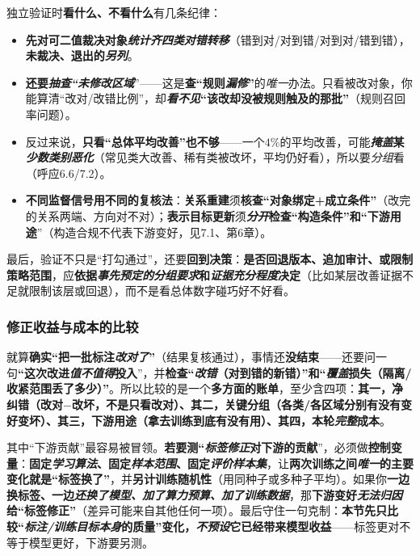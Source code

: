 独立验证时\textbf{看什么、不看什么}有几条纪律：
\begin{itemize}\item \textbf{先对可二值裁决对象\emph{统计齐四类对错转移}}（错到对/对到错/对到对/错到错），\textbf{未裁决、退出的\emph{另列}}。\item \textbf{还要\emph{抽查“未修改区域}}”——这是\textbf{查“规则\emph{漏修}”}的\emph{唯一}办法。只看被改对象，你能算清“改对/改错比例”，却\textbf{\emph{看不见}“该改却没被规则触及的那批”}（规则召回率问题）。\item 反过来说，\textbf{只看“总体平均改善”也不够}——一个$4\%$的平均改善，可能\textbf{\emph{掩盖}某\emph{少数类别}\emph{恶化}}（常见类大改善、稀有类被改坏，平均仍好看），所以要\emph{分组}看（呼应6.6/7.2）。\item \textbf{不同监督信号用不同的复核法}：\textbf{关系重建}须\textbf{核查“对象绑定+成立条件”}（改完的关系两端、方向对不对）；\textbf{表示目标更新}须\textbf{\emph{分开}检查“构造条件”和“下游用途}”（构造合规不代表下游变好，见7.1、第6章）。\end{itemize}
最后，验证不只是“打勾通过”，还要\textbf{回到决策}：\textbf{是否回退版本、追加审计、或限制策略范围}，应\textbf{依据\emph{事先预定的分组要求}和\emph{证据充分程度}决定}（比如某层改善证据不足就限制该层或回退），而不是看总体数字碰巧好不好看。

\subsubsection{修正收益与成本的比较}
\label{sec:knowledge-quality-assessment-correction-benefit-cost}

就算\textbf{确实“把一批标注\emph{改对了}”}（结果复核通过），事情还\textbf{没结束}——还要问一句\textbf{“这次改进\emph{值不值得}投入}”，并\textbf{检查“\emph{改错}（对到错的新错）”和“\emph{覆盖}损失（隔离/收紧范围丢了多少）”}。所以比较的是一个\textbf{多方面的账单}，至少含四项：\textbf{其一，净纠错（改对$-$改坏，不是只看改对）、其二，关键分组（各类/各区域分别有没有变好变坏）、其三，下游用途（拿去训练到底有没有用）、其四，本轮\emph{完整}成本}。

其中“下游贡献”最容易被冒领。\textbf{若要测“\emph{标签修正}对下游的贡献}”，必须做\textbf{控制变量}：\textbf{固定\emph{学习算法}、固定\emph{样本范围}、固定\emph{评价样本集}}，让\textbf{两次训练之间\emph{唯一}的主要变化就是“标签换了”}，并\textbf{另计训练随机性}（用同种子或多种子平均）。如果你\textbf{一边换标签、一边\emph{还换了模型、加了算力预算、加了训练数据}}，那\textbf{下游变好\emph{无法归因}给“标签修正”}（差异可能来自其他任何一项）。最后守住一句克制：\textbf{本节先只比较“\emph{标注/训练目标本身}的质量”变化，\emph{不预设}它已经带来模型收益}——标签更对不等于模型更好，下游要另测。

